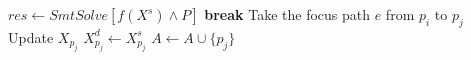 	\STATE $res \gets SmtSolve\left[
	f(X^s) \wedge P
	\right]$
		\STATE \textbf{break}
	\ENDIF
	\STATE Take the focus path $e$ from $p_i$ to $p_j$
	\STATE Update $X_{p_j}$
	\STATE $X^d_{p_j} \gets X^s_{p_j}$
	\STATE $A \gets A \cup \{p_j\}$
\ENDWHILE

